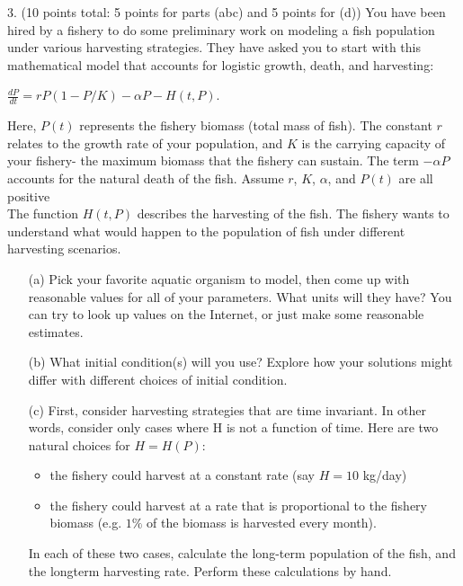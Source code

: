 \documentclass[12pt,letterpaper]{hmcpset}
\begin{document}
\begin{problem}
3. (10 points total: 5 points for parts (abc) and 5 points for (d)) You have been hired by a
fishery to do some preliminary work on modeling a fish population under various harvesting
strategies. They have asked you to start with this mathematical model that accounts for
logistic growth, death, and harvesting:\\

\begin{center}
    $\frac{dP}{dt}= rP(1 - P/K)-\alpha P-H(t, P)$.
\end{center}

Here, $P(t)$ represents the fishery biomass (total mass of fish). The constant $r$ relates to
the growth rate of your population, and $K$ is the carrying capacity of your fishery- the
maximum biomass that the fishery can sustain. The term $-\alpha P$ accounts for the natural
death of the fish. Assume $r$, $K$, $\alpha$, and $P(t)$ are all positive\\

The function $H(t, P)$ describes the harvesting of the fish. The fishery wants to understand
what would happen to the population of fish under different harvesting scenarios.

\begin{enumerate}
    \item[(a)]Pick your favorite aquatic organism to model, then come up with reasonable values for
all of your parameters. What units will they have? You can try to look up values on
the Internet, or just make some reasonable estimates.
    \item[(b)] What initial condition(s) will you use? Explore how your solutions might differ with
different choices of initial condition.
    \item[(c)] First, consider harvesting strategies that are time invariant. In other words, consider
only cases where H is not a function of time. Here are two natural choices for
$H = H(P)$:

\begin{itemize}
  \item the fishery could harvest at a constant rate (say $H = 10$ kg/day)
  \item the fishery could harvest at a rate that is proportional to the fishery biomass
(e.g. $1\%$ of the biomass is harvested every month).
\end{itemize}
In each of these two cases, calculate the long-term population of the fish, and the longterm
harvesting rate. Perform these calculations by hand.


\end{enumerate}
\end{problem}
\end{document}

